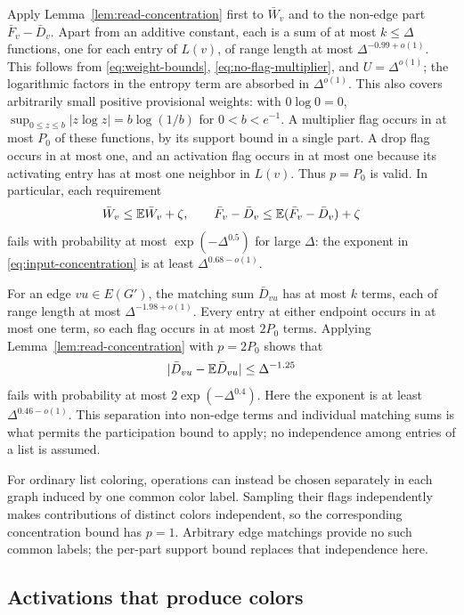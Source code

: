 Apply Lemma~\ref{lem:read-concentration} first to $\bar W_v$ and to
the non-edge part $\bar F_v-\bar D_v$.  Apart from an additive constant,
each is a sum of at most $k\le\Delta$ functions, one for each entry of
$L(v)$, of range length at most $\Delta^{-0.99+o(1)}$.  This follows
from \eqref{eq:weight-bounds}, \eqref{eq:no-flag-multiplier}, and
$U=\Delta^{o(1)}$; the logarithmic factors in the entropy term are
absorbed in $\Delta^{o(1)}$.  This also covers arbitrarily small
positive provisional weights: with $0\log0=0$,
$\sup_{0\le z\le b}|z\log z|=b\log(1/b)$ for $0<b<e^{-1}$.
A multiplier flag occurs in at most
$P_0$ of these functions, by its support bound in a single part.
A drop flag occurs in at most one, and an activation flag occurs in
at most one because its activating entry has at most one neighbor
in $L(v)$.  Thus $p=P_0$ is valid.  In particular, each requirement
\begin{equation}\label{eq:vertex-concentration}
 \bar W_v\le\mathbb E\bar W_v+\zeta,\qquad
 \bar F_v-\bar D_v\le\mathbb E(\bar F_v-\bar D_v)+\zeta
\end{equation}
fails with probability at most $\exp(-\Delta^{0.5})$ for large $\Delta$:
the exponent in \eqref{eq:input-concentration} is at least
$\Delta^{0.68-o(1)}$.

For an edge $vu\in E(G')$, the matching sum $\bar D_{vu}$ has at
most $k$ terms, each of range length at most
$\Delta^{-1.98+o(1)}$.  Every entry at either endpoint occurs in at
most one term, so each flag occurs in at most $2P_0$ terms.  Applying
Lemma~\ref{lem:read-concentration} with $p=2P_0$ shows that
\begin{equation}\label{eq:matching-concentration}
 |\bar D_{vu}-\mathbb E\bar D_{vu}|\le\Delta^{-1.25}
\end{equation}
fails with probability at most $2\exp(-\Delta^{0.4})$.  Here the
exponent is at least $\Delta^{0.46-o(1)}$.  This separation into
non-edge terms and individual matching sums is what permits the
participation bound to apply; no independence among entries of a
list is assumed.

For ordinary list coloring, operations can instead be chosen separately
in each graph induced by one common color label.  Sampling their flags
independently makes contributions of distinct colors independent, so
the corresponding concentration bound has $p=1$.  Arbitrary edge
matchings provide no such common labels; the per-part support bound
replaces that independence here.

\subsection{Activations that produce colors}

